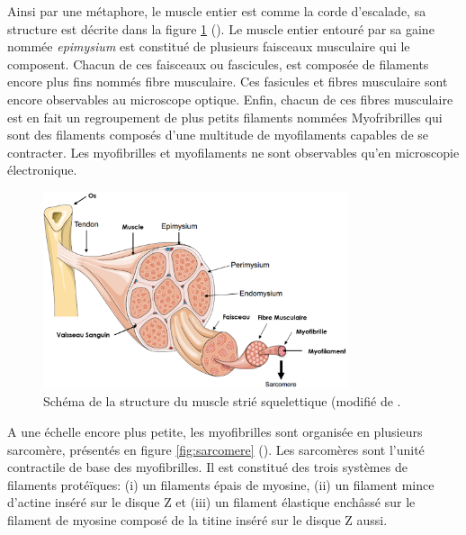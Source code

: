 Ainsi par une métaphore, le muscle entier est comme la corde d'escalade, sa structure est décrite dans la figure \ref{fig:muscle_struct} (\cite{burr_basic_2019}). Le muscle entier entouré par sa gaine nommée \textit{epimysium} est constitué de plusieurs faisceaux musculaire qui le composent. Chacun de ces faisceaux ou fascicules, est composée de filaments encore plus fins nommés fibre musculaire. Ces fasicules et fibres musculaire sont encore observables au microscope optique. Enfin, chacun de ces fibres musculaire est en fait un regroupement de plus petits filaments nommées Myofribrilles qui  sont des filaments composés d'une multitude de myofilaments capables de se contracter. Les myofibrilles et myofilaments ne sont observables qu'en microscopie électronique.

\begin{figure}[!htbp]
 \centering
 \includegraphics[width=0.8\textwidth]{figures/muscle.png}
 \caption[Schéma de la structure du muscle strié squelettique (modifié de \cite{burr_basic_2019}]{Schéma de la structure du muscle strié squelettique (modifié de \cite{burr_basic_2019}.}
 \label{fig:muscle_struct}
\end{figure}
A une échelle encore plus petite, les myofibrilles sont organisée en plusieurs sarcomère, présentés en figure \ref{fig:sarcomere} (\cite{burr_basic_2019}). Les sarcomères sont l'unité contractile de base des myofibrilles. Il est constitué des trois systèmes de filaments protéïques: (i) un filaments épais de myosine, (ii) un filament mince d'actine inséré sur le disque Z et (iii) un filament élastique enchâssé sur le filament de myosine composé de la titine inséré sur le disque Z aussi.

